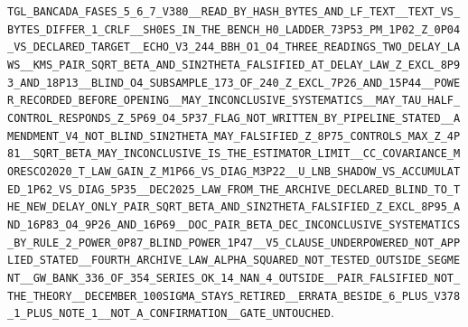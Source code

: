\documentclass[11pt]{article}
\theoremstyle{definition}\newtheorem{deriv}{Derivation}
\begin{document}
\texttt{TGL\_BANCADA\_FASES\_5\_6\_7\_V380\_\_READ\_BY\_HASH\_BYTES\_AND\_LF\_TEXT\_\_TEXT\_VS\_BYTES\_DIFFER\_1\_CRLF\_\_SH0ES\_IN\_THE\_BENCH\_H0\_LADDER\_73P53\_PM\_1P02\_Z\_0P04\_VS\_DECLARED\_TARGET\_\_ECHO\_V3\_244\_BBH\_O1\_O4\_THREE\_READINGS\_TWO\_DELAY\_LAWS\_\_KMS\_PAIR\_SQRT\_BETA\_AND\_SIN2THETA\_FALSIFIED\_AT\_DELAY\_LAW\_Z\_EXCL\_8P93\_AND\_18P13\_\_BLIND\_O4\_SUBSAMPLE\_173\_OF\_240\_Z\_EXCL\_7P26\_AND\_15P44\_\_POWER\_RECORDED\_BEFORE\_OPENING\_\_MAY\_INCONCLUSIVE\_SYSTEMATICS\_\_MAY\_TAU\_HALF\_CONTROL\_RESPONDS\_Z\_5P69\_O4\_5P37\_FLAG\_NOT\_WRITTEN\_BY\_PIPELINE\_STATED\_\_AMENDMENT\_V4\_NOT\_BLIND\_SIN2THETA\_MAY\_FALSIFIED\_Z\_8P75\_CONTROLS\_MAX\_Z\_4P81\_\_SQRT\_BETA\_MAY\_INCONCLUSIVE\_IS\_THE\_ESTIMATOR\_LIMIT\_\_CC\_COVARIANCE\_MORESCO2020\_T\_LAW\_GAIN\_Z\_M1P66\_VS\_DIAG\_M3P22\_\_U\_LNB\_SHADOW\_VS\_ACCUMULATED\_1P62\_VS\_DIAG\_5P35\_\_DEC2025\_LAW\_FROM\_THE\_ARCHIVE\_DECLARED\_BLIND\_TO\_THE\_NEW\_DELAY\_ONLY\_PAIR\_SQRT\_BETA\_AND\_SIN2THETA\_FALSIFIED\_Z\_EXCL\_8P95\_AND\_16P83\_O4\_9P26\_AND\_16P69\_\_DOC\_PAIR\_BETA\_DEC\_INCONCLUSIVE\_SYSTEMATICS\_BY\_RULE\_2\_POWER\_0P87\_BLIND\_POWER\_1P47\_\_V5\_CLAUSE\_UNDERPOWERED\_NOT\_APPLIED\_STATED\_\_FOURTH\_ARCHIVE\_LAW\_ALPHA\_SQUARED\_NOT\_TESTED\_OUTSIDE\_SEGMENT\_\_GW\_BANK\_336\_OF\_354\_SERIES\_OK\_14\_NAN\_4\_OUTSIDE\_\_PAIR\_FALSIFIED\_NOT\_THE\_THEORY\_\_DECEMBER\_100SIGMA\_STAYS\_RETIRED\_\_ERRATA\_BESIDE\_6\_PLUS\_V378\_1\_PLUS\_NOTE\_1\_\_NOT\_A\_CONFIRMATION\_\_GATE\_UNTOUCHED}.
\end{document}
